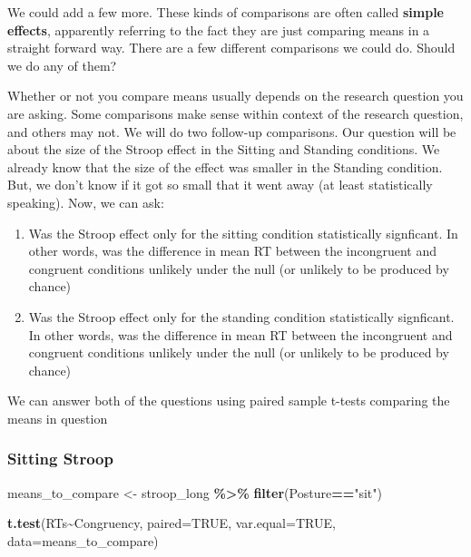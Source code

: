 \documentclass[
]{book}
\newenvironment{Shaded}{\begin{snugshade}}{\end{snugshade}}
\newcommand{\AttributeTok}[1]{\textcolor[rgb]{0.13,0.29,0.53}{#1}}
\newcommand{\ConstantTok}[1]{\textcolor[rgb]{0.56,0.35,0.01}{#1}}
\newcommand{\FunctionTok}[1]{\textcolor[rgb]{0.13,0.29,0.53}{\textbf{#1}}}
\newcommand{\NormalTok}[1]{#1}
\newcommand{\OtherTok}[1]{\textcolor[rgb]{0.56,0.35,0.01}{#1}}
\newcommand{\SpecialCharTok}[1]{\textcolor[rgb]{0.81,0.36,0.00}{\textbf{#1}}}
\newcommand{\StringTok}[1]{\textcolor[rgb]{0.31,0.60,0.02}{#1}}
\begin{document}
We could add a few more. These kinds of comparisons are often called \textbf{simple effects}, apparently referring to the fact they are just comparing means in a straight forward way. There are a few different comparisons we could do. Should we do any of them?

Whether or not you compare means usually depends on the research question you are asking. Some comparisons make sense within context of the research question, and others may not. We will do two follow-up comparisons. Our question will be about the size of the Stroop effect in the Sitting and Standing conditions. We already know that the size of the effect was smaller in the Standing condition. But, we don't know if it got so small that it went away (at least statistically speaking). Now, we can ask:

\begin{enumerate}
\def\labelenumi{\arabic{enumi}.}
\item
  Was the Stroop effect only for the sitting condition statistically signficant. In other words, was the difference in mean RT between the incongruent and congruent conditions unlikely under the null (or unlikely to be produced by chance)
\item
  Was the Stroop effect only for the standing condition statistically signficant. In other words, was the difference in mean RT between the incongruent and congruent conditions unlikely under the null (or unlikely to be produced by chance)
\end{enumerate}

We can answer both of the questions using paired sample t-tests comparing the means in question

\hypertarget{sitting-stroop}{%
\subsubsection{Sitting Stroop}\label{sitting-stroop}}

\begin{Shaded}
\begin{Highlighting}[]
\NormalTok{means\_to\_compare }\OtherTok{\textless{}{-}}\NormalTok{ stroop\_long }\SpecialCharTok{\%\textgreater{}\%}
                      \FunctionTok{filter}\NormalTok{(Posture}\SpecialCharTok{==}\StringTok{"sit"}\NormalTok{)}

\FunctionTok{t.test}\NormalTok{(RTs}\SpecialCharTok{\textasciitilde{}}\NormalTok{Congruency, }\AttributeTok{paired=}\ConstantTok{TRUE}\NormalTok{, }\AttributeTok{var.equal=}\ConstantTok{TRUE}\NormalTok{, }\AttributeTok{data=}\NormalTok{means\_to\_compare)}
\end{Highlighting}
\end{Shaded}
\end{document}
